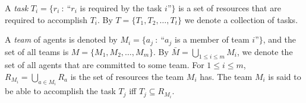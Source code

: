 \documentclass{llncs}
\begin{document}
\begin{definition}[Task]
A \emph{task} $T_i=\{r_i\ :\ $``$r_i$ is required by the task $i$''$\}$ is a set of resources that are required to accomplish $T_i$. By $T=\{T_1, T_2,\dots, T_t\}$ we denote a collection of tasks.
\end{definition}

\begin{definition}[Team]
A \emph{team} of agents is denoted by $M_i=\{a_j\ :\ $``$a_j$ is a member of team $i$''$\}$, and the set of all teams is $M=\{M_1, M_2,\dots , M_m\}$. By $\bar{M} = \bigcup_{1\leq i\leq m} M_i$, we denote the set of all agents that are committed to some team. For $1\leq i\leq m$, $R_{M_i}=\bigcup_{a \in M_i}R_{a}$ is the set of resources the team $M_i$ has. The team $M_i$ is said to be able to accomplish the task $T_j$ iff $T_j \subseteq R_{M_i}$.
\end{definition}
\end{document}
